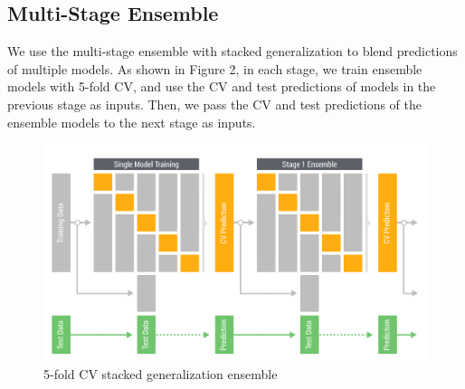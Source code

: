 \subsection{Multi-Stage Ensemble}
We use the multi-stage ensemble with stacked generalization \cite{wolpert1992stacked, ting1999issues} to blend predictions of multiple models.  As shown in Figure 2, in each stage, we train ensemble models with 5-fold CV, and use the CV and test predictions of models in the previous stage as inputs.  Then, we pass the CV and test predictions of the ensemble models to the next stage as inputs.\\


\begin{figure}[!ht]
  \caption{5-fold CV stacked generalization ensemble}
  \centering
    \includegraphics[width=0.5 \textwidth]{cv_ensemble}
\end{figure}


